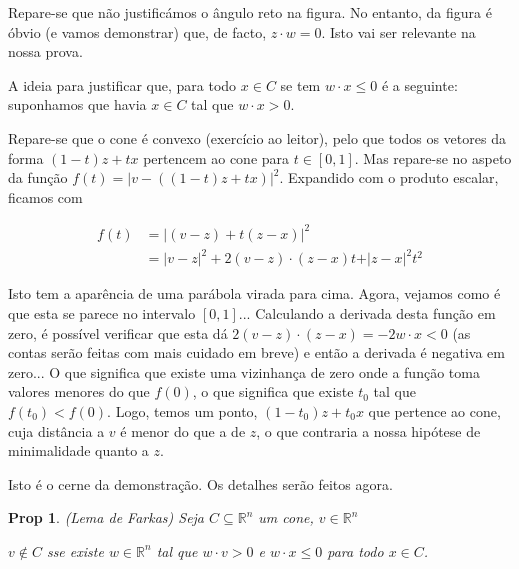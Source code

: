\documentclass{article}
\newcommand{\R}{\mathbb{R}}
\newtheorem{prop}{Prop}
\theoremstyle{definition}
\begin{document}
	Repare-se que não justificámos o ângulo reto na figura. No entanto, da figura é óbvio (e vamos demonstrar) que, de facto, $z \cdot w = 0$. Isto vai ser relevante na nossa prova.
	
	A ideia para justificar que, para todo $x \in C$ se tem $w \cdot x \leq 0$ é a seguinte: suponhamos que havia $x \in C$ tal que $w \cdot x > 0$.
	
	Repare-se que o cone é convexo (exercício ao leitor), pelo que todos os vetores da forma $(1-t) z + t x$ pertencem ao cone para $t \in [0,1]$. Mas repare-se no aspeto da função $f(t) = \rvert v - ((1-t) z + t x) \lvert ^2$. Expandido com o produto escalar, ficamos com
	
	\begin{align*}
	f(t) &= \rvert(v - z) + t(z - x)\lvert^2 \\
	&= \rvert v-z \lvert^2 + 2 (v - z) \cdot (z - x) t + \rvert z - x \lvert^2 t^2
	\end{align*}
	
	Isto tem a aparência de uma parábola virada para cima. Agora, vejamos como é que esta se parece no intervalo $[0,1]$... Calculando a derivada desta função em zero, é possível verificar que esta dá $2 (v - z) \cdot (z - x) = - 2 w \cdot x < 0$ (as contas serão feitas com mais cuidado em breve) e então a derivada é negativa em zero... O que significa que existe uma vizinhança de zero onde a função toma valores menores do que $f(0)$, o que significa que existe $t_0$ tal que $f(t_0) < f(0)$. Logo, temos um ponto, $(1-t_0) z + t_0 x$ que pertence ao cone, cuja distância a $v$ é menor do que a de $z$, o que contraria a nossa hipótese de minimalidade quanto a $z$.
	
	Isto é o cerne da demonstração. Os detalhes serão feitos agora.
	
	\begin{prop} (Lema de Farkas)
	Seja $C \subseteq \R^n$ um cone, $v \in \R^n$
	
	$v \not \in C$ sse existe $w \in \R^n$ tal que $w \cdot v > 0$ e $w \cdot x \leq 0$ para todo $x \in C$.
	\end{prop}
	
\end{document}
